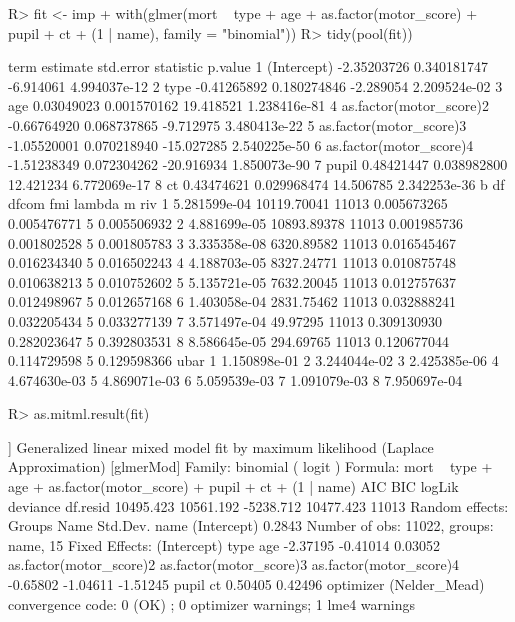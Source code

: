 \documentclass[
]{jss}
\begin{document}
\begin{CodeChunk}
\begin{CodeInput}
R> fit <- imp %
+   with(glmer(mort ~ type + age + as.factor(motor_score) + pupil + ct + (1 | name), family = "binomial")) 
R> tidy(pool(fit))
\end{CodeInput}
\begin{CodeOutput}
                     term    estimate   std.error  statistic      p.value
1             (Intercept) -2.35203726 0.340181747  -6.914061 4.994037e-12
2                    type -0.41265892 0.180274846  -2.289054 2.209524e-02
3                     age  0.03049023 0.001570162  19.418521 1.238416e-81
4 as.factor(motor_score)2 -0.66764920 0.068737865  -9.712975 3.480413e-22
5 as.factor(motor_score)3 -1.05520001 0.070218940 -15.027285 2.540225e-50
6 as.factor(motor_score)4 -1.51238349 0.072304262 -20.916934 1.850073e-90
7                   pupil  0.48421447 0.038982800  12.421234 6.772069e-17
8                      ct  0.43474621 0.029968474  14.506785 2.342253e-36
             b          df dfcom         fmi      lambda m         riv
1 5.281599e-04 10119.70041 11013 0.005673265 0.005476771 5 0.005506932
2 4.881699e-05 10893.89378 11013 0.001985736 0.001802528 5 0.001805783
3 3.335358e-08  6320.89582 11013 0.016545467 0.016234340 5 0.016502243
4 4.188703e-05  8327.24771 11013 0.010875748 0.010638213 5 0.010752602
5 5.135721e-05  7632.20045 11013 0.012757637 0.012498967 5 0.012657168
6 1.403058e-04  2831.75462 11013 0.032888241 0.032205434 5 0.033277139
7 3.571497e-04    49.97295 11013 0.309130930 0.282023647 5 0.392803531
8 8.586645e-05   294.69765 11013 0.120677044 0.114729598 5 0.129598366
          ubar
1 1.150898e-01
2 3.244044e-02
3 2.425385e-06
4 4.674630e-03
5 4.869071e-03
6 5.059539e-03
7 1.091079e-03
8 7.950697e-04
\end{CodeOutput}
\begin{CodeInput}
R> as.mitml.result(fit)
\end{CodeInput}
\begin{CodeOutput}
[[1]]
Generalized linear mixed model fit by maximum likelihood (Laplace
  Approximation) [glmerMod]
 Family: binomial  ( logit )
Formula: mort ~ type + age + as.factor(motor_score) + pupil + ct + (1 |  
    name)
      AIC       BIC    logLik  deviance  df.resid 
10495.423 10561.192 -5238.712 10477.423     11013 
Random effects:
 Groups Name        Std.Dev.
 name   (Intercept) 0.2843  
Number of obs: 11022, groups:  name, 15
Fixed Effects:
            (Intercept)                     type                      age  
               -2.37195                 -0.41014                  0.03052  
as.factor(motor_score)2  as.factor(motor_score)3  as.factor(motor_score)4  
               -0.65802                 -1.04611                 -1.51245  
                  pupil                       ct  
                0.50405                  0.42496  
optimizer (Nelder_Mead) convergence code: 0 (OK) ; 0 optimizer warnings; 1 lme4 warnings 


\end{CodeOutput}
\end{CodeChunk}
\end{document}
